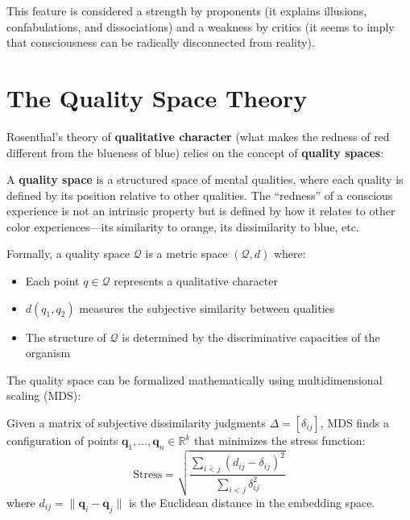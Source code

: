 \documentclass[11pt,a4paper]{report}
\begin{document}
This feature is considered a strength by proponents (it explains illusions, confabulations, and dissociations) and a weakness by critics (it seems to imply that consciousness can be radically disconnected from reality).

\section{The Quality Space Theory}

Rosenthal's theory of \textbf{qualitative character} (what makes the redness of red different from the blueness of blue) relies on the concept of \textbf{quality spaces}:

\begin{definitionbox}
A \textbf{quality space} is a structured space of mental qualities, where each quality is defined by its position relative to other qualities. The ``redness'' of a conscious experience is not an intrinsic property but is defined by how it relates to other color experiences---its similarity to orange, its dissimilarity to blue, etc.

Formally, a quality space $\mathcal{Q}$ is a metric space $(\mathcal{Q}, d)$ where:
\begin{itemize}[leftmargin=1.5em]
  \item Each point $q \in \mathcal{Q}$ represents a qualitative character
  \item $d(q_1, q_2)$ measures the subjective similarity between qualities
  \item The structure of $\mathcal{Q}$ is determined by the discriminative capacities of the organism
\end{itemize}
\end{definitionbox}

The quality space can be formalized mathematically using multidimensional scaling (MDS):

\begin{mathbox}
\vspace{-6pt}
Given a matrix of subjective dissimilarity judgments $\Delta = [\delta_{ij}]$, MDS finds a configuration of points $\mathbf{q}_1, \ldots, \mathbf{q}_n \in \mathbb{R}^k$ that minimizes the stress function:
\[
  \text{Stress} = \sqrt{\frac{\sum_{i < j} (d_{ij} - \delta_{ij})^2}{\sum_{i < j} \delta_{ij}^2}}
\]
where $d_{ij} = \|\mathbf{q}_i - \mathbf{q}_j\|$ is the Euclidean distance in the embedding space.
\vspace{-4pt}
\end{mathbox}
\end{document}
